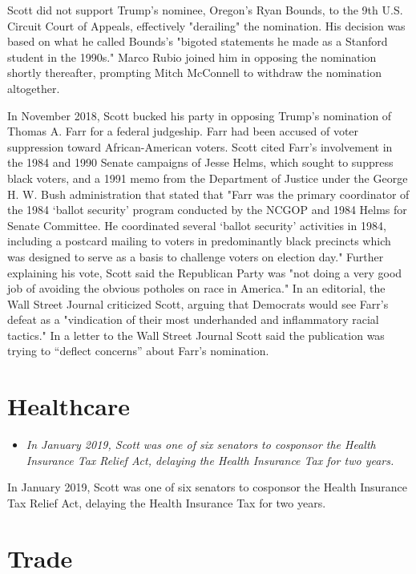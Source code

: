 Scott did not support Trump's nominee, Oregon's Ryan Bounds, to the 9th
U.S. Circuit Court of Appeals, effectively "derailing" the nomination.
His decision was based on what he called Bounds's "bigoted statements he
made as a Stanford student in the 1990s." Marco Rubio joined him in
opposing the nomination shortly thereafter, prompting Mitch McConnell to
withdraw the nomination altogether.

In November 2018, Scott bucked his party in opposing Trump's nomination
of Thomas A. Farr for a federal judgeship. Farr had been accused of
voter suppression toward African-American voters. Scott cited Farr's
involvement in the 1984 and 1990 Senate campaigns of Jesse Helms, which
sought to suppress black voters, and a 1991 memo from the Department of
Justice under the George H. W. Bush administration that stated that
"Farr was the primary coordinator of the 1984 `ballot security' program
conducted by the NCGOP and 1984 Helms for Senate Committee. He
coordinated several `ballot security' activities in 1984, including a
postcard mailing to voters in predominantly black precincts which was
designed to serve as a basis to challenge voters on election day."
Further explaining his vote, Scott said the Republican Party was "not
doing a very good job of avoiding the obvious potholes on race in
America." In an editorial, the Wall Street Journal criticized Scott,
arguing that Democrats would see Farr's defeat as a "vindication of
their most underhanded and inflammatory racial tactics." In a letter to
the Wall Street Journal Scott said the publication was trying to
``deflect concerns'' about Farr's nomination.

\section{Healthcare}\label{healthcare}

\begin{itemize}
\item
  \emph{In January 2019, Scott was one of six senators to cosponsor the
  Health Insurance Tax Relief Act, delaying the Health Insurance Tax for
  two years.}
\end{itemize}

In January 2019, Scott was one of six senators to cosponsor the Health
Insurance Tax Relief Act, delaying the Health Insurance Tax for two
years.

\section{Trade}\label{trade}

